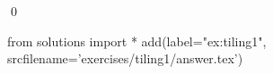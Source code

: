 
\begin{ex} 
  \label{ex:tiling1}
  
  \qed
\end{ex} 
\begin{python0}
from solutions import *
add(label="ex:tiling1",
    srcfilename='exercises/tiling1/answer.tex') 
\end{python0}
